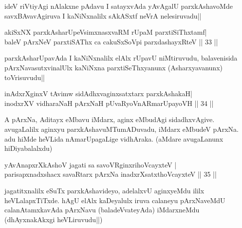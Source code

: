 \begin{artha} 
ideV riVtiyAgi nAlakxne pAdavu I satayxvAda yAvAgalU parxkAshavoMde 
savxBAvavAgiruva I kaNiNxnalilx sAkASxtf neVrA nelesiruvadu||
\end{artha}


\begin{shl}
akiSxNX parxkAsharUpeV\s simxnasxvaRM rUpaM parxtiSiThxtamf| \\
baleV pArxNeV parxtiSAThx ca cakuSxSoV\s pi parxdashayxRteV \hfill ||  33 || 
\end{shl}

\begin{artha} 
parxkAsharUpavAda I kaNiNxnalilx elAlx rUpavU niMtiruvudu, 
balavenisida pArxNavasutxvinalUlx kaNiNxna parxtiSeThxyanunx 
(Asharxyavanunx) toVrisuvudu||
\end{artha}


\begin{shl}
inAdxrXginxV tAvimw sidAdhxvaginxsatxtarx parxkAshakaH| \\
inodxrXV vidharaNaH pArxNaH pUvaRyoVnARmarUpayoVH \hfill ||  34 || 
\end{shl}

\begin{artha} 
A pArxNa, Aditayx eMbavu iMdarx, aginx eMbudAgi sidadhxvAgive. 
avugaLalilx aginxyu parxkAshavuMTumADuvadu, iMdarx eMbudeV pArxNa. adu 
hiMde heVLida nAmarUpagaLige vidhAraka. (aMdare avugaLanunx 
hiDiyabalalxdu)
\end{artha}


\begin{shl}
yAvAnapxrXkAshoV jagati sa savoVR\s ginxrihoVcayxteV | \\
parisapxnadxshacx savaRtarx pArxNa inadxrXsatxthoVcayxteV \hfill ||  35 || 
\end{shl}

\begin{artha} 
jagatitxnalilx eSuTx parxkAshavideyo, adelalxvU aginxyeMdu ililx 
heVLalapxTiTxde. hAgU elAlx kaDeyalulx iruva calaneyu pArxNaveMdU 
calanAtamxkavAda pArxNavu (baladeVvateyAda) iMdarxneMdu (dhAyxnakAkxgi 
heVLiruvudu||)
\end{artha}

